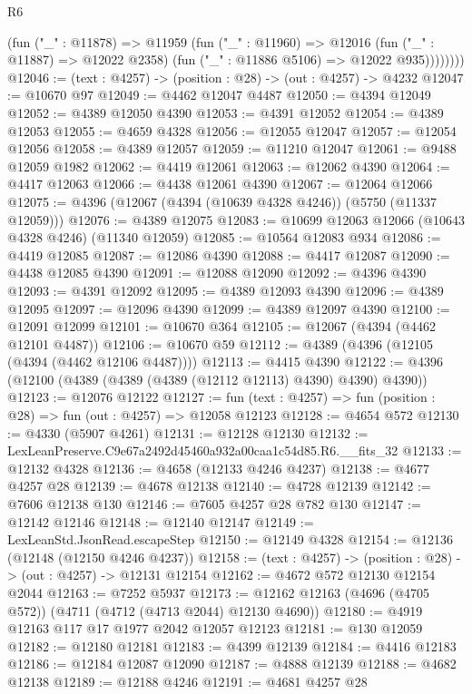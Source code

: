 \begin{lexlean}{R6}
\begin{coremodule}
              (fun ("_" : @11878) =>
              @11959
                (fun ("_" : @11960) =>
                @12016
                  (fun ("_" : @11887) => @12022 @2358)
                  (fun ("_" : @11886 @5106) => @12022 @935))))))))
@12046 := (text : @4257) -> (position : @28) -> (out : @4257) -> @4232
@12047 := @10670 @97
@12049 := @4462 @12047 @4487
@12050 := @4394 @12049
@12052 := @4389 @12050 @4390
@12053 := @4391 @12052
@12054 := @4389 @12053
@12055 := @4659 @4328
@12056 := @12055 @12047
@12057 := @12054 @12056
@12058 := @4389 @12057
@12059 := @11210 @12047
@12061 := @9488 @12059 @1982
@12062 := @4419 @12061
@12063 := @12062 @4390
@12064 := @4417 @12063
@12066 := @4438 @12061 @4390
@12067 := @12064 @12066
@12075 := @4396 (@12067 (@4394 (@10639 @4328 @4246)) (@5750 (@11337 @12059)))
@12076 := @4389 @12075
@12083 := @10699 @12063 @12066 (@10643 @4328 @4246) (@11340 @12059)
@12085 := @10564 @12083 @934
@12086 := @4419 @12085
@12087 := @12086 @4390
@12088 := @4417 @12087
@12090 := @4438 @12085 @4390
@12091 := @12088 @12090
@12092 := @4396 @4390
@12093 := @4391 @12092
@12095 := @4389 @12093 @4390
@12096 := @4389 @12095
@12097 := @12096 @4390
@12099 := @4389 @12097 @4390
@12100 := @12091 @12099
@12101 := @10670 @364
@12105 := @12067 (@4394 (@4462 @12101 @4487))
@12106 := @10670 @59
@12112 := @4389 (@4396 (@12105 (@4394 (@4462 @12106 @4487))))
@12113 := @4415 @4390
@12122 := @4396 (@12100 (@4389 (@4389 (@4389 (@12112 @12113) @4390) @4390) @4390))
@12123 := @12076 @12122
@12127 := fun (text : @4257) => fun (position : @28) => fun (out : @4257) => @12058 @12123
@12128 := @4654 @572
@12130 := @4330 (@5907 @4261)
@12131 := @12128 @12130
@12132 := LexLeanPreserve.C9e67a2492d45460a932a00caa1c54d85.R6.__fits_32
@12133 := @12132 @4328
@12136 := @4658 (@12133 @4246 @4237)
@12138 := @4677 @4257 @28
@12139 := @4678 @12138
@12140 := @4728 @12139
@12142 := @7606 @12138 @130
@12146 := @7605 @4257 @28 @782 @130
@12147 := @12142 @12146
@12148 := @12140 @12147
@12149 := LexLeanStd.JsonRead.escapeStep
@12150 := @12149 @4328
@12154 := @12136 (@12148 (@12150 @4246 @4237))
@12158 := (text : @4257) -> (position : @28) -> (out : @4257) -> @12131 @12154
@12162 := @4672 @572 @12130 @12154 @2044
@12163 := @7252 @5937
@12173 := @12162 @12163 (@4696 (@4705 @572)) (@4711 (@4712 (@4713 @2044) @12130 @4690))
@12180 := @4919 @12163 @117 @17 @1977 @2042 @12057 @12123
@12181 := @130 @12059
@12182 := @12180 @12181
@12183 := @4399 @12139
@12184 := @4416 @12183
@12186 := @12184 @12087 @12090
@12187 := @4888 @12139
@12188 := @4682 @12138
@12189 := @12188 @4246
@12191 := @4681 @4257 @28

\end{coremodule}
\end{lexlean}
